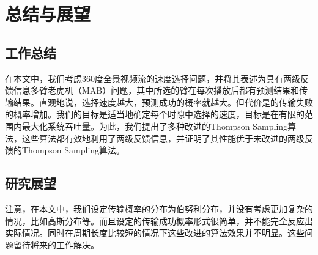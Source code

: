 \chapter{总结与展望}
\section{工作总结}
在本文中，我们考虑360度全景视频流的速度选择问题，并将其表述为具有两级反馈信息多臂老虎机（MAB）问题，其中所选的臂在每次播放后都有预测结果和传输结果。直观地说，选择速度越大，预测成功的概率就越大。但代价是的传输失败的概率增加。我们的目标是适当地确定每个时隙中选择的速度，目标是在有限的范围内最大化系统吞吐量。为此，我们提出了多种改进的Thompson Sampling算法，这些算法都有效地利用了两级反馈信息，并证明了其性能优于未改进的两级反馈的Thompson Sampling算法。

\section{研究展望}
注意，在本文中，我们设定传输概率的分布为伯努利分布，并没有考虑更加复杂的情况，比如高斯分布等。而且设定的传输成功概率形式很简单，并不能完全反应出实际情况。同时在周期长度比较短的情况下这些改进的算法效果并不明显。这些问题留待将来的工作解决。